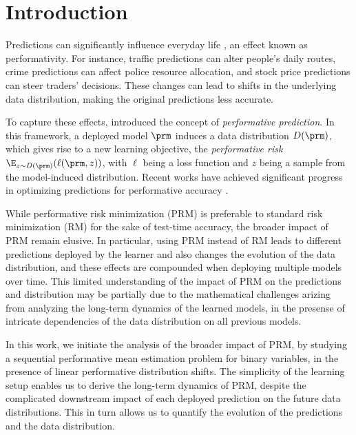 \section{Introduction}
\label{sec:intro}

Predictions can significantly influence everyday life \citep{r18t}, an effect
known as performativity. For instance, traffic predictions can alter people's
daily routes, crime predictions can affect police resource allocation, and
stock price predictions can steer traders' decisions. These changes can lead to
shifts in the underlying data distribution, making the original predictions
less accurate.

To capture these effects, \citet{p20p} introduced the concept of
\emph{performative prediction}. In this framework, a deployed model $\prm$
induces a data distribution $D(\prm)$, which gives rise to a new learning objective, the
\emph{performative risk} $\E_{z \sim D(\prm)}(\ell(\prm, z))$, with $\ell$ being
a loss function and $z$ being a sample from the model-induced distribution.
Recent works have achieved significant progress in optimizing predictions for
performative accuracy \citep[see][for a recent survey]{hardt2023performative}.

While performative risk minimization (PRM) is preferable to standard risk minimization (RM) for the sake of test-time accuracy, the broader impact of PRM remain elusive. In particular, using PRM instead of RM leads to different predictions deployed by the learner and also changes the evolution of the data distribution, and these effects are compounded when deploying multiple models over time. This limited understanding of the impact of PRM on the predictions and distribution may be partially due to the mathematical challenges arizing from analyzing the long-term dynamics of the learned models, in the presense of intricate dependencies of the data distribution on all previous models.


 In this work, we initiate the analysis of the broader impact of PRM, by studying a sequential performative mean estimation problem for binary variables, in the presence of linear performative distribution shifts. The simplicity of the learning setup enables us to derive the long-term dynamics of PRM, despite the complicated downstream impact of each deployed prediction on the future data distributions. This in turn allows us to quantify the evolution of the predictions and the data distribution.

